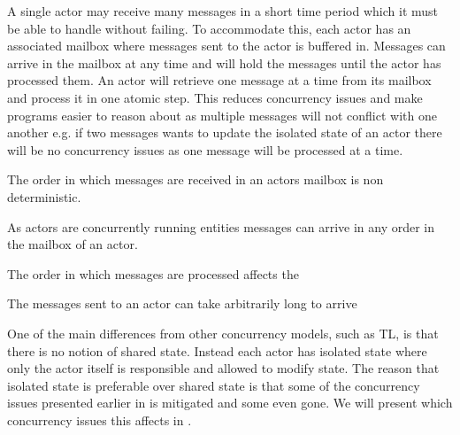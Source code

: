 A single actor may receive many messages in a short time period which it must be able to handle without failing. To accommodate this, each actor has an associated mailbox where messages sent to the actor is buffered in\cite[Chap. 2.6]{haller2012actors}. Messages can arrive in the mailbox at any time and will hold the messages until the actor has processed them. An actor will retrieve one message at a time from its mailbox and process it in one atomic step\cite[p. 2]{karmani2009actor}. This reduces concurrency issues and make programs easier to reason about as multiple messages will not conflict with one another e.g. if two messages wants to update the isolated state of an actor there will be no concurrency issues as one message will be processed at a time.

The order in which messages are received in an actors mailbox is non deterministic.

As actors are concurrently running entities messages can arrive in any order in the mailbox of an actor.

The order in which messages are processed affects the 




The messages sent to an actor can take arbitrarily long to arrive



One of the main differences from other concurrency models, such as \ac{TL}, is that there is no notion of shared state. Instead each actor has isolated state where only the actor itself is responsible and allowed to modify state. The reason that isolated state is preferable over shared state is that some of the concurrency issues presented earlier in  is mitigated and some even gone. We will present which concurrency issues this affects in .



